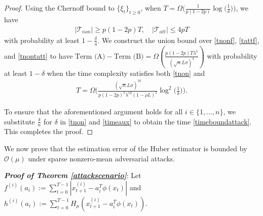 \documentclass[letterpaper,10pt,conference]{ieeeconf}
\theoremstyle{plain} %
\theoremstyle{plain} %
\theoremstyle{plain} %
\theoremstyle{plain}
\begin{document}
\begin{proof}
Using the Chernoff bound to $\{\xi_t\}_{t\ge 0}$, when $T=\Omega\bigr( \frac{1}{p(1-2p)}\log\bigr(\frac{1}{\delta}\bigr) \bigr)$, we have 
\begin{align}\label{tnontatt}    |\mathcal{T}_{non}| \ge p(1-2p)T, \quad |\mathcal{T}_{att}| \le 4pT
\end{align}
with probability at least $1-\frac{\delta}{4}$. We construct the union bound over \eqref{tnonf}, \eqref{tattf}, and \eqref{tnontatt} to have $\text{Term (A)}-\text{Term (B)} =\Omega(\frac{p(1-2p)T\lambda^5}{(\sqrt{n} L\sigma)^4})$ with probability at least $1-\delta$ when the time complexity satisfies both \eqref{tnon} and \begin{align}\label{timeaux}
     T=\Omega\biggr( \frac{(\sqrt{n}L\sigma)^{10}}{p(1-2p)^2\lambda^{10}  (1-\rho L)^2}\log^2\Bigr(\frac{1}{\delta}\Bigr)\biggr).
\end{align}

To ensure that the aforementioned argument holds for all $i\in\{1,\dots,n\}$, we substitute $\frac{\delta}{n}$ for $\delta$ in \eqref{tnon} and \eqref{timeaux} to obtain the time  \eqref{timeboundattack}. This completes the proof.
\end{proof}

\medskip
We now prove that the estimation error of the Huber estimator is bounded by $\mathcal{O}(\mu)$ under sparse nonzero-mean adversarial attacks.

\textit{\textbf{Proof of Theorem \ref{attackscenario}}}:
Let
$ f^{(i)}(a_i) := \sum_{t=0}^{T-1} |x_{t+1}^{(i)}-a_i^T \phi(x_t)|$ and   $h^{(i)}(a_i):= \sum_{t=0}^{T-1} H_\mu (x_{t+1}^{(i)}-a_i^T \phi(x_t) )$.
\end{document}
